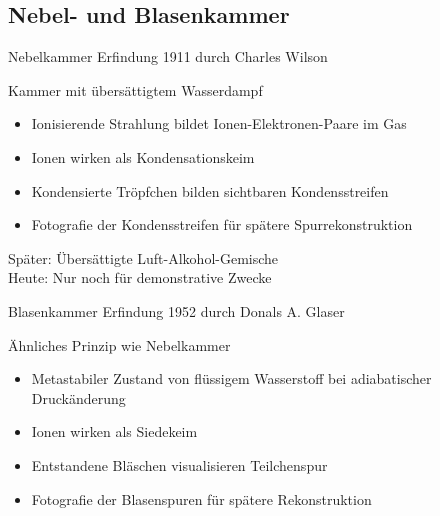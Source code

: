 \subsection[]{Nebel- und Blasenkammer}


\begin{frame}{Nebelkammer}
	Erfindung 1911 durch Charles Wilson
	\begin{block}{Kammer mit übersättigtem Wasserdampf}
		\begin{itemize}
		  \item Ionisierende Strahlung bildet Ionen-Elektronen-Paare im Gas
		  \item Ionen wirken als Kondensationskeim
		  \item Kondensierte Tröpfchen bilden sichtbaren Kondensstreifen 
		  \item Fotografie der Kondensstreifen für spätere Spurrekonstruktion
		\end{itemize}
	\end{block}
	Später: Übersättigte Luft-Alkohol-Gemische\\
	Heute: Nur noch für demonstrative Zwecke
\end{frame}


\begin{frame}{Blasenkammer}
	Erfindung 1952 durch Donals A. Glaser
	\begin{block}{Ähnliches Prinzip wie Nebelkammer}
		\begin{itemize}
		  \item Metastabiler Zustand von flüssigem Wasserstoff bei adiabatischer
		  Druckänderung
		  \item Ionen wirken als Siedekeim
		  \item Entstandene Bläschen visualisieren Teilchenspur 
		  \item Fotografie der Blasenspuren für spätere Rekonstruktion
		\end{itemize}
	\end{block}
\end{frame}


